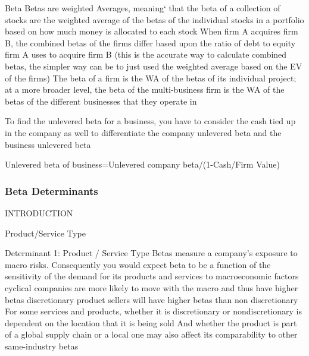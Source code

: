 \documentclass[10pt]{article}
\begin{document}
\begin{core}{Beta}
      Betas are weighted Averages, meaning‘ that the beta of a collection of stocks are the weighted average of the betas of the individual stocks in a portfolio based on how much money is allocated to each stock
      When firm A acquires firm B, the combined betas of the firms differ based upon the ratio of debt to equity firm A uses to acquire firm B (this is the accurate way to calculate combined betas, the simpler way can be to just used the weighted average based on the EV of the firms)
      The beta of a firm is the WA of the betas of its individual project; at a more broader level, the beta of the multi-business firm is the WA of the betas of the different businesses that they operate in

      To find the unlevered beta for a business, you have to consider the cash tied up in the company as well to differentiate the company unlevered beta and the business unlevered beta

      Unlevered beta of business=Unlevered company beta/(1-Cash/Firm Value)

    \end{core}

    \subsubsection{Beta Determinants}

      INTRODUCTION

      \begin{core}{Product/Service Type}

        Determinant 1: Product / Service Type
        Betas measure a company’s exposure to macro risks. Consequently you would expect beta to be a function of the sensitivity of the demand for its products and services to macroeconomic factors
        cyclical companies are more likely to move with the macro and thus have higher betas
        discretionary product sellers will have higher betas than non discretionary
        For some services and products, whether it is discretionary or nondiscretionary is dependent on the location that it is being sold
        And whether the product is part of a global supply chain or a local one may also affect its comparability to other same-industry betas

      \end{core}
\end{document}
